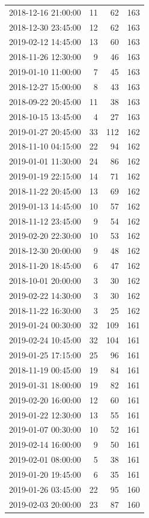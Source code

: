 \begin{tabular}{lrrr}
2018-12-16 21:00:00 & 11 & 62 & 163 \\
2018-12-30 23:45:00 & 12 & 62 & 163 \\
2019-02-12 14:45:00 & 13 & 60 & 163 \\
2018-11-26 12:30:00 & 9 & 46 & 163 \\
2019-01-10 11:00:00 & 7 & 45 & 163 \\
2018-12-27 15:00:00 & 8 & 43 & 163 \\
2018-09-22 20:45:00 & 11 & 38 & 163 \\
2018-10-15 13:45:00 & 4 & 27 & 163 \\
2019-01-27 20:45:00 & 33 & 112 & 162 \\
2018-11-10 04:15:00 & 22 & 94 & 162 \\
2019-01-01 11:30:00 & 24 & 86 & 162 \\
2019-01-19 22:15:00 & 14 & 71 & 162 \\
2018-11-22 20:45:00 & 13 & 69 & 162 \\
2019-01-13 14:45:00 & 10 & 57 & 162 \\
2018-11-12 23:45:00 & 9 & 54 & 162 \\
2019-02-20 22:30:00 & 10 & 53 & 162 \\
2018-12-30 20:00:00 & 9 & 48 & 162 \\
2018-11-20 18:45:00 & 6 & 47 & 162 \\
2018-10-01 20:00:00 & 3 & 30 & 162 \\
2019-02-22 14:30:00 & 3 & 30 & 162 \\
2018-11-22 16:30:00 & 3 & 25 & 162 \\
2019-01-24 00:30:00 & 32 & 109 & 161 \\
2019-02-24 10:45:00 & 32 & 104 & 161 \\
2019-01-25 17:15:00 & 25 & 96 & 161 \\
2018-11-19 00:45:00 & 19 & 84 & 161 \\
2019-01-31 18:00:00 & 19 & 82 & 161 \\
2019-02-20 16:00:00 & 12 & 60 & 161 \\
2019-01-22 12:30:00 & 13 & 55 & 161 \\
2019-01-07 00:30:00 & 10 & 52 & 161 \\
2019-02-14 16:00:00 & 9 & 50 & 161 \\
2019-02-01 08:00:00 & 5 & 38 & 161 \\
2019-01-20 19:45:00 & 6 & 35 & 161 \\
2019-01-26 03:45:00 & 22 & 95 & 160 \\
2019-02-03 20:00:00 & 23 & 87 & 160 \\

\end{tabular}
